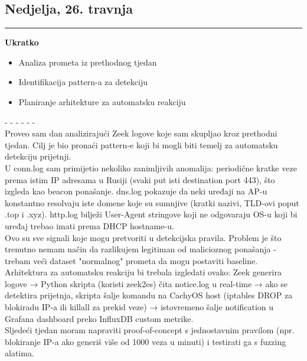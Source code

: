 \documentclass[12pt, a4paper]{article}
\newcommand{\dan}[1]{
    \subsection*{#1}
    \vspace{-0.5em} 
    \hrule \vspace{0.5em} 
}
\begin{document}
\dan{Nedjelja, 26. travnja}
\textbf{Ukratko}
\begin{itemize}
    \item Analiza prometa iz prethodnog tjedan
    \item Identifikacija pattern-a za detekciju
    \item Planiranje arhitekture za automatsku reakciju
\end{itemize}
- - - - - - \\
Proveo sam dan analizirajući Zeek logove koje sam skupljao kroz prethodni tjedan. Cilj je bio pronaći pattern-e koji bi mogli biti temelj za automatsku detekciju prijetnji.
\\
U conn.log sam primijetio nekoliko zanimljivih anomalija: periodične kratke veze prema istim IP adresama u Rusiji (svaki put isti destination port 443), što izgleda kao beacon ponašanje. dns.log pokazuje da neki uređaji na AP-u konstantno resolvaju iste domene koje su sumnjive (kratki nazivi, TLD-ovi poput .top i .xyz). http.log bilježi User-Agent stringove koji ne odgovaraju OS-u koji bi uređaj trebao imati prema DHCP hostname-u.
\\
Ovo su sve signali koje mogu pretvoriti u detekcijska pravila. Problem je što trenutno nemam način da razlikujem legitiman od malicioznog ponašanja - trebam veći dataset "normalnog" prometa da mogu postaviti baseline.
\\
Arhitektura za automatsku reakciju bi trebala izgledati ovako: Zeek generira logove → Python skripta (koristi zeek2es) čita notice.log u real-time → ako se detektira prijetnja, skripta šalje komandu na CachyOS host (iptables DROP za blokiradu IP-a ili killall za prekid veze) → istovremeno šalje notification u Grafana dashboard preko InfluxDB custom metrike.
\\
Sljedeći tjedan moram napraviti proof-of-concept s jednostavnim pravilom (npr. blokiranje IP-a ako generiš više od 1000 veza u minuti) i testirati ga s fuzzing alatima.
\end{document}
